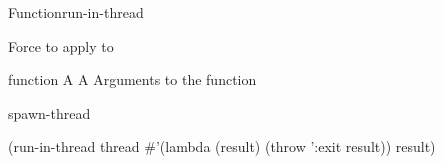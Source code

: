 \documentclass[10pt,twoside,english,pdftex]{article}
\begin{document}

\begin{functiondoc}{Function}{run-in-thread}{
    }
%

\fnsyntax

\fnpurpose Force  to apply  to 

\fnpackage {}

\fnmodule {}

\fnargs
\begin{args}{function}
\arg[thread] A 
\arg[function] A 
\arg[args] Arguments to the function
\end{args}

\fnerrors
\nothreads{}

\begin{alsos}{spawn-thread}
\end{alsos}

\fnexample
%
\W\supp
\begin{example}
  (run-in-thread thread
                 #'(lambda (result) (throw ':exit result)) 
                 result)
\end{example}

\end{functiondoc}

\end{document}
